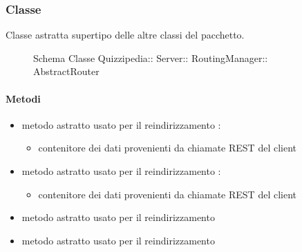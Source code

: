 \subsubsection{Classe }
Classe astratta supertipo delle altre classi del pacchetto.
\begin{figure}[H]
\centering
\noindent{}
\caption[Schema Classe AbstractRouter]{Schema Classe Quizzipedia:: Server:: RoutingManager:: AbstractRouter}
\end{figure}
\paragraph{Metodi}
\begin{itemize}
\item {}
\newline
metodo astratto usato per il reindirizzamento
\newline
{} :
\begin{itemize}
\item {}
\newline
contenitore dei dati provenienti da chiamate REST del client
\end{itemize}
\item {}
\newline
metodo astratto usato per il reindirizzamento
\newline
{} :
\begin{itemize}
\item {}
\newline
contenitore dei dati provenienti da chiamate REST del client
\end{itemize}
\item {}
\newline
metodo astratto usato per il reindirizzamento
\newline
\item {}
\newline
metodo astratto usato per il reindirizzamento
\newline
\end{itemize}
